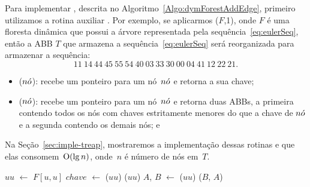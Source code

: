 Para implementar \dymForestAddEdge{}, descrita no Algoritmo~\ref{Algo:dymForestAddEdge}, primeiro utilizamos a rotina auxiliar \ETmovetofront{}.
Por exemplo, se aplicarmos \ETmovetofront($F$,1), onde $F$ é uma floresta dinâmica que possui a árvore representada pela sequência~\eqref{eq:eulerSeq}, então a ABB $T$ que armazena a sequência~\eqref{eq:eulerSeq} será reorganizada para armazenar a sequência:
\begin{equation}
11~14~44~45~55~54~40~03~33~30~00~04~41~12~22~21.\nonumber
\end{equation}
\begin{itemize}
\item \treapOrder($n\acute{o}$): recebe um ponteiro para um nó~$n\acute{o}$ e retorna a sua chave;
\item \treapSplit($n\acute{o}$): recebe um ponteiro para um nó~$n\acute{o}$ e retorna duas ABBs, a primeira contendo todos os nós com chaves estritamente menores do que a chave de $n\acute{o}$ e a segunda contendo os demais nós; e
\end{itemize}

Na Seção~\ref{sec:imple-treap}, mostraremos a implementação dessas rotinas e que elas consomem~$\mathrm{O}(\lg n)$, onde~$n$ é número de nós em~$T$.


\begin{algorithm}[htb]
\caption{\ETmovetofront($F$, $u$)}
\label{Algo:ETmovetofront}
\begin{algorithmic}[1]
\State $uu$ $\gets$ $F[u,u]$
\State $chave$ $\gets$ \treapOrder($uu$)
\label{algo:move:if}
\State \Return  \treapGetRoot($uu$)
\EndIf
\State $A$, $B$ $\gets$ \treapSplit($uu$)
\State \Return \treapJoin($B$, $A$)
\end{algorithmic}
\end{algorithm}


